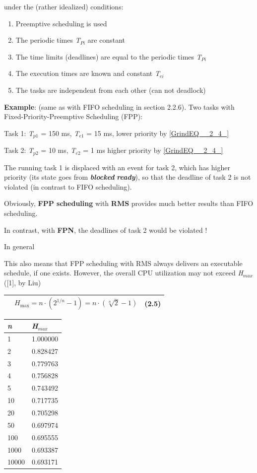 under the (rather idealized) conditions:


\begin{enumerate}
	\item  Preemptive scheduling is used
	\item  The periodic times \textit{T${}_{Pi}$} are constant 		
	\item  The time limits (deadlines) are equal to the periodic times \textit{T${}_{Pi}$}
	\item  The execution times are known and constant \textit{T${}_{ei}$}
	\item  The tasks are independent from each other (can not deadlock)
\end{enumerate}

\textbf{Example}: (same as with FIFO scheduling in section 2.2.6). Two tasks with Fixed-Priority-Preemptive Scheduling (FPP):

Task 1: \textit{T}${}_{p1}$ = 150 ms, \textit{T}${}_{e1}$ = 15 ms,   lower priority by   \eqref{GrindEQ__2_4_}

Task 2: \textit{T}${}_{p2}$ = 10 ms,  \textit{T}${}_{e2}$ = 1 ms   higher priority by \eqref{GrindEQ__2_4_}

The running task 1 is displaced with an event for task 2, which has higher priority (its state goes from \textbf{\textit{blocked}}  \textbf{\textit{ready}}), so that the deadline of task 2 is not violated (in contrast to FIFO scheduling).

Obviously,\textbf{ FPP scheduling} with \textbf{RMS} provides much better results than FIFO scheduling. 

In contrast, with \textbf{FPN}, the deadlines of task 2 would be violated !

In general

This also means that FPP scheduling with RMS always delivers an executable schedule, if one exists. However, the overall CPU utilization may not exceed \textit{H${}_{max}$ }([1], by Liu)

\begin{tabular}{|p{0.3in}|p{3.9in}|p{0.4in}|} \hline 
 &   $H_{\max } =n\cdot \left(2^{1/n} -1\right)=n\cdot \left(\sqrt[{n}]{2} -1\right)$ & (2.5) \\ \hline 
\end{tabular}

\begin{tabular}{|p{0.7in}|p{0.6in}|} \hline 
\textbf{\textit{n}} & \textbf{\textit{H${}_{max}$}} \\ \hline 
1 & 1.000000 \\ \hline 
2 & 0.828427 \\ \hline 
3 & 0.779763 \\ \hline 
4 & 0.756828 \\ \hline 
5 & 0.743492 \\ \hline 
10 & 0.717735 \\ \hline 
20 & 0.705298 \\ \hline 
50 & 0.697974 \\ \hline 
100 & 0.695555 \\ \hline 
1000 & 0.693387 \\ \hline 
10000 & 0.693171 \\ \hline 
\end{tabular}

